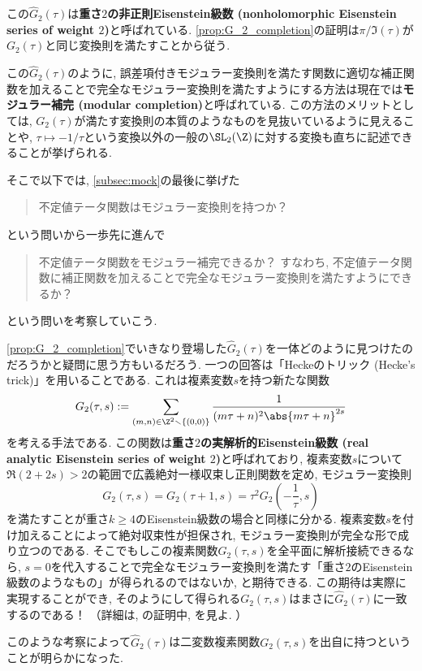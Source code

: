 \documentclass[11pt,b5paper,oneside,lualatex]{ltjsarticle} %
\numberwithin{equation}{section} %
\begin{document}
この$ \widehat{G}_2 (\tau) $は\textbf{重さ$ 2 $の非正則Eisenstein級数 (nonholomorphic Eisenstein series of weight $ 2 $)}と呼ばれている. 
\cref{prop:G_2_completion}の証明は$ \pi / \Im (\tau) $が$ G_2(\tau) $と同じ変換則を満たすことから従う. 

この$ \widehat{G}_2 (\tau) $のように, 誤差項付きモジュラー変換則を満たす関数に適切な補正関数を加えることで完全なモジュラー変換則を満たすようにする方法は現在では\textbf{モジュラー補完 (modular completion)}と呼ばれている. 
この方法のメリットとしては, $ G_2(\tau) $が満たす変換則の本質のようなものを見抜いているように見えることや, $ \tau \mapsto -1/\tau $という変換以外の一般の$ \SL_2(\Z) $に対する変換も直ちに記述できることが挙げられる. 

そこで以下では, \cref{subsec:mock}の最後に挙げた
\begin{quote}
	\centering
	不定値テータ関数はモジュラー変換則を持つか？
\end{quote}
という問いから一歩先に進んで
\begin{quote}
	\centering
	不定値テータ関数をモジュラー補完できるか？
	すなわち, 不定値テータ関数に補正関数を加えることで完全なモジュラー変換則を満たすようにできるか？
\end{quote}
という問いを考察していこう. 

\begin{rem} \label{rem:Hecke_trick}
	\cref{prop:G_2_completion}でいきなり登場した$ \widehat{G}_2 (\tau) $を一体どのように見つけたのだろうかと疑問に思う方もいるだろう. 
	一つの回答は「Heckeのトリック (Hecke's trick)」を用いることである. 
	これは複素変数$ s $を持つ新たな関数
	\[
	G_2 (\tau, s) := \sum_{(m, n) \in \Z^2 \smallsetminus \{ (0, 0) \}} \frac{1}{(m\tau + n)^2 \abs{m\tau + n}^{2s}}
	\]
	を考える手法である. 
	この関数は\textbf{重さ$ 2 $の実解析的Eisenstein級数 (real analytic Eisenstein series of weight $ 2 $)}と呼ばれており, 
	複素変数$ s $について$ \Re(2+2s) > 2 $の範囲で広義絶対一様収束し正則関数を定め, モジュラー変換則
	\[
	G_2 (\tau, s) = G_2 (\tau+1, s) = \tau^{2} G_2 \left( - \frac{1}{\tau}, s \right)
	\]
	を満たすことが重さ$ k \ge 4 $のEisenstein級数の場合と同様に分かる. 
	複素変数$ s $を付け加えることによって絶対収束性が担保され, モジュラー変換則が完全な形で成り立つのである. 
	そこでもしこの複素関数$ G_2 (\tau, s) $を全平面に解析接続できるなら, $ s=0 $を代入することで完全なモジュラー変換則を満たす「重さ$ 2 $のEisenstein級数のようなもの」が得られるのではないか, と期待できる. 
	この期待は実際に実現することができ, そのようにして得られる$ G_2 (\tau, s) $はまさに$ \widehat{G}_2 (\tau) $に一致するのである！
	（詳細は\cite[Theorem 4.10.2]{DS}, \cite[pp.~19, Proposition 6]{1-2-3}の証明中, \cite[Lemma 6.2]{BFOR}を見よ. ）
	
	このような考察によって$ \widehat{G}_2 (\tau) $は二変数複素関数$ G_2 (\tau, s) $を出自に持つということが明らかになった. 
\end{rem}
\end{document}
